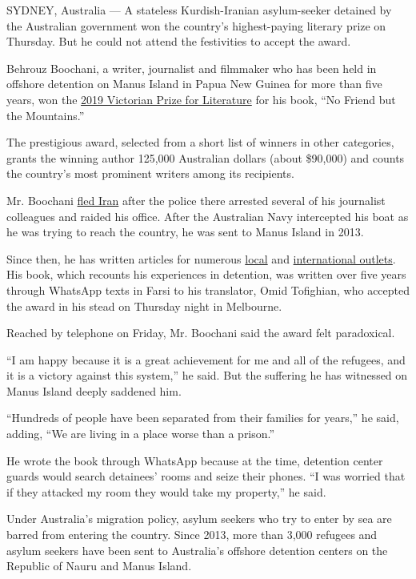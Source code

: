 SYDNEY, Australia --- A stateless Kurdish-Iranian asylum-seeker detained
by the Australian government won the country's highest-paying literary
prize on Thursday. But he could not attend the festivities to accept the
award.

Behrouz Boochani, a writer, journalist and filmmaker who has been held
in offshore detention on Manus Island in Papua New Guinea for more than
five years, won the
\href{https://www.wheelercentre.com/news/behrouz-boochani-wins-the-2019-victorian-prize-for-literature}{2019
Victorian Prize for Literature} for his book, ``No Friend but the
Mountains.''

The prestigious award, selected from a short list of winners in other
categories, grants the winning author 125,000 Australian dollars (about
\$90,000) and counts the country's most prominent writers among its
recipients.

Mr. Boochani
\href{https://www.nytimes3xbfgragh.onion/2017/02/13/insider/manus-island-refugee-australia.html}{fled
Iran} after the police there arrested several of his journalist
colleagues and raided his office. After the Australian Navy intercepted
his boat as he was trying to reach the country, he was sent to Manus
Island in 2013.

Since then, he has written articles for numerous
\href{https://www.thesaturdaypaper.com.au/contributor/behrouz-boochani}{local}
and
\href{https://www.theguardian.com/profile/behrouz-boochani}{international
outlets}. His book, which recounts his experiences in detention, was
written over five years through WhatsApp texts in Farsi to his
translator, Omid Tofighian, who accepted the award in his stead on
Thursday night in Melbourne.

Reached by telephone on Friday, Mr. Boochani said the award felt
paradoxical.

``I am happy because it is a great achievement for me and all of the
refugees, and it is a victory against this system,'' he said. But the
suffering he has witnessed on Manus Island deeply saddened him.

``Hundreds of people have been separated from their families for
years,'' he said, adding, ``We are living in a place worse than a
prison.''

He wrote the book through WhatsApp because at the time, detention center
guards would search detainees' rooms and seize their phones. ``I was
worried that if they attacked my room they would take my property,'' he
said.

Under Australia's migration policy, asylum seekers who try to enter by
sea are barred from entering the country. Since 2013, more than 3,000
refugees and asylum seekers have been sent to Australia's offshore
detention centers on the Republic of Nauru and Manus Island.

